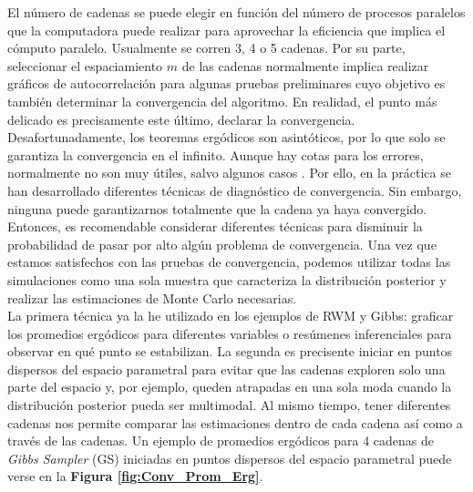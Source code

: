 El número de cadenas se puede elegir en función del número de procesos paralelos que la computadora puede realizar para aprovechar la eficiencia que implica el cómputo paralelo. Usualmente se corren 3, 4 o 5 cadenas. Por su parte, seleccionar el espaciamiento $m$ de las cadenas normalmente implica realizar gráficos de autocorrelación para algunas pruebas preliminares cuyo objetivo es también determinar la convergencia del algoritmo. En realidad, el punto más delicado es precisamente este último, declarar la convergencia.\\ 

Desafortunadamente, los teoremas ergódicos son asintóticos, por lo que solo se garantiza la convergencia en el infinito. Aunque hay cotas para los errores, normalmente no son muy útiles, salvo algunos casos \parencite{SmithRoberts93}. Por ello, en la práctica se han desarrollado diferentes técnicas de diagnóstico de convergencia. Sin embargo, ninguna puede garantizarnos totalmente que la cadena ya haya convergido. Entonces, es recomendable considerar diferentes técnicas para disminuir la probabilidad de pasar por alto algún problema de convergencia. Una vez que estamos satisfechos con las pruebas de convergencia, podemos utilizar todas las simulaciones como una sola muestra que caracteriza la distribución posterior y realizar las estimaciones de Monte Carlo necesarias.\\

La primera técnica ya la he utilizado en los ejemplos de RWM y Gibbs: graficar los promedios ergódicos para diferentes variables o resúmenes inferenciales para observar en qué punto se estabilizan. La segunda es precisente iniciar en puntos dispersos del espacio parametral para evitar que las cadenas exploren solo una parte del espacio y, por ejemplo, queden atrapadas en una sola moda cuando la distribución posterior pueda ser multimodal. Al mismo tiempo, tener diferentes cadenas nos permite comparar las estimaciones dentro de cada cadena así como a través de las cadenas. Un ejemplo de promedios ergódicos para 4 cadenas de \textit{Gibbs Sampler} (GS) iniciadas en puntos dispersos del espacio parametral puede verse en la \textbf{Figura \ref{fig:Conv_Prom_Erg}}.\\ 

